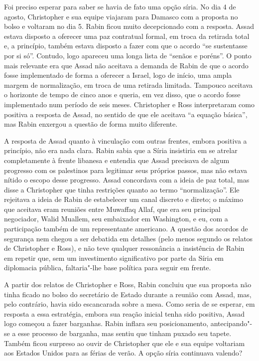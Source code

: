 Foi preciso esperar para saber se havia de fato uma opção síria. No dia
4 de agosto, Christopher e sua equipe viajaram para Damasco com a
proposta no bolso e voltaram no dia 5. Rabin ficou muito decepcionado
com a resposta. Assad estava disposto a oferecer uma paz contratual
formal, em troca da retirada total e, a princípio, também estava
disposto a fazer com que o acordo ``se sustentasse por si só''. Contudo,
logo apareceu uma longa lista de ``senãos e poréns''. O ponto mais
relevante era que Assad não aceitava a demanda de Rabin de que o acordo
fosse implementado de forma a oferecer a Israel, logo de início, uma
ampla margem de normalização, em troca de uma retirada limitada.
Tampouco aceitava o horizonte de tempo de cinco anos e queria, em vez
disso, que o acordo fosse implementado num período de seis meses.
Christopher e Ross interpretaram como positiva a resposta de Assad, no
sentido de que ele aceitava ``a equação básica'', mas Rabin enxergou a
questão de forma muito diferente.

A resposta de Assad quanto à vinculação com outras frentes, embora
positiva a princípio, não era nada clara. Rabin sabia que a Síria
insistiria em se atrelar completamente à frente libanesa e entendia que
Assad precisava de algum progresso com os palestinos para legitimar seus
próprios passos, mas não estava nítido o escopo desse progresso. Assad
concordava com a ideia de paz total, mas disse a Christopher que tinha
restrições quanto ao termo ``normalização''. Ele rejeitava a ideia de
Rabin de estabelecer um canal discreto e direto; o máximo que aceitava
eram reuniões entre Muwaffaq Allaf, que era seu principal negociador, Walid Muallem,
seu embaixador em Washington, e eu, com a participação também
de um representante americano. A questão dos acordos de segurança nem
chegou a ser debatida em detalhes (pelo menos segundo os relatos de
Christopher e Ross), e não teve qualquer ressonância a insistência de
Rabin em repetir que, sem um investimento significativo por parte da Síria em
diplomacia pública, faltaria"-lhe base política para seguir em frente.

A partir dos relatos de Christopher e Ross, Rabin concluiu que sua
proposta não tinha ficado no bolso do secretário de Estado durante a
reunião com Assad, mas, pelo contrário, havia sido escancarada sobre a
mesa. Como seria de se esperar, em resposta a essa estratégia, embora sua
reação inicial tenha sido positiva, Assad logo começou a fazer barganhas.
Rabin inflara seu posicionamento, antecipando"-se a esse processo de
barganha, mas sentiu que tinham puxado seu tapete. Também ficou surpreso
ao ouvir de Christopher que ele e sua equipe voltariam aos Estados
Unidos para as férias de verão. A opção síria continuava valendo?


